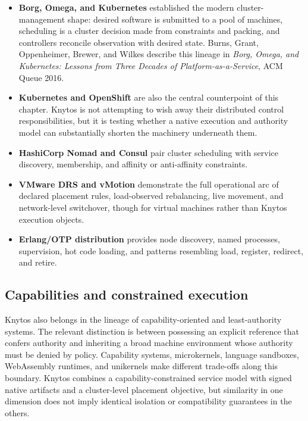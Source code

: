 \begin{itemize}
    \item \textbf{Borg, Omega, and Kubernetes} established the modern
        cluster-management shape: desired software is submitted to a pool of
        machines, scheduling is a cluster decision made from constraints and
        packing, and controllers reconcile observation with desired state.
        Burns, Grant, Oppenheimer, Brewer, and Wilkes describe this lineage in
        \emph{Borg, Omega, and Kubernetes: Lessons from Three Decades of
        Platform-as-a-Service}, ACM Queue 2016.

    \item \textbf{Kubernetes and OpenShift} are also the central counterpoint
        of this chapter. Knytos is not attempting to wish away their
        distributed control responsibilities, but it is testing whether a native
        execution and authority model can substantially shorten the machinery
        underneath them.

    \item \textbf{HashiCorp Nomad and Consul} pair cluster scheduling with
        service discovery, membership, and affinity or anti-affinity
        constraints.

    \item \textbf{VMware DRS and vMotion} demonstrate the full operational
        arc of declared placement rules, load-observed rebalancing, live
        movement, and network-level switchover, though for virtual machines
        rather than Knytos execution objects.

    \item \textbf{Erlang/OTP distribution} provides node discovery, named
        processes, supervision, hot code loading, and patterns resembling
        load, register, redirect, and retire.
\end{itemize}

\subsection{Capabilities and constrained execution}

Knytos also belongs in the lineage of capability-oriented and
least-authority systems. The relevant distinction is between possessing an
explicit reference that confers authority and inheriting a broad machine
environment whose authority must be denied by policy. Capability systems,
microkernels, language sandboxes, WebAssembly runtimes, and unikernels make
different trade-offs along this boundary. Knytos combines a
capability-constrained service model with signed native artifacts and a
cluster-level placement objective, but similarity in one dimension does not
imply identical isolation or compatibility guarantees in the others.

